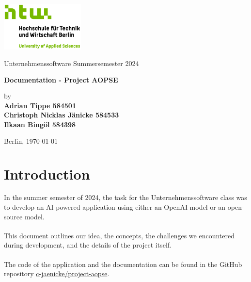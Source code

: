 \documentclass[
    a4paper,
    pagesize,
	pdftex,
    12pt,
]{scrartcl}
\begin{document}
\begin{titlepage}
    \begin{center}
        \includegraphics[height=25mm]{S04_HTW_Berlin_Logo_pos_FARBIG_RGB.jpg} \\
        \vspace{1.0cm}

        Unternehmenssoftware Summersemester 2024
    
        \vspace{1.5cm}   

        \textbf{Documentation - Project AOPSE}

        \vspace{1.5cm}

        by \\
        \textbf{Adrian Tippe 584501} \\
        \textbf{Christoph Nicklas Jänicke 584533}\\
        \textbf{Ilkaan Bingöl 584398}

        \vspace{1.5cm}    
        Berlin, \today\\
    \end{center}
\end{titlepage}


\thispagestyle{empty}
\tableofcontents
\newpage


\section{Introduction}
In the summer semester of 2024, the task for the Unternehmenssoftware class was to develop an AI-powered application using either an OpenAI model or an open-source model.
\\ \\
This document outlines our idea, the concepts, the challenges we encountered during development, and the details of the project itself.
\\ \\
The code of the application and the documentation can be found in the GitHub repository \hyperlink{https://github.com/c-jaenicke/project-aopse}{c-jaenicke/project-aopse}.
\end{document}
